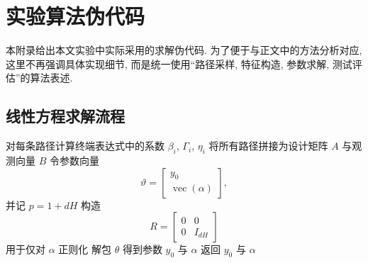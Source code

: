 
\chapter{实验算法伪代码}\label{ch:pseudocode}
  本附录给出本文实验中实际采用的求解伪代码.
  为了便于与正文中的方法分析对应, 这里不再强调具体实现细节,
  而是统一使用“路径采样, 特征构造, 参数求解, 测试评估”的算法表述.

  \section{线性方程求解流程}\label{sec:app_linear_method}
    \begin{algorithm}[htbp]
      \SetAlgoLined
      对每条路径计算终端表达式中的系数 $\beta_{i}$, $\Gamma_{i}$, $\eta_{i}$\;
      将所有路径拼接为设计矩阵 $A$ 与观测向量 $B$\;
      令参数向量
      \begin{equation*}
        \vartheta =
        \begin{bmatrix}
          y_{0} \\
          \operatorname{vec}(\alpha)
        \end{bmatrix},
      \end{equation*}
      并记 $p = 1 + dH$\;
      构造
      \begin{equation*}
        R =
        \begin{bmatrix}
          0 & 0 \\
          0 & I_{dH}
        \end{bmatrix}
      \end{equation*}
      用于仅对 $\alpha$ 正则化\;
      解包 $\theta$ 得到参数 $y_{0}$ 与 $\alpha$\;
      返回 $y_{0}$ 与 $\alpha$\;
      \caption{线性方程的求解流程}
      \label{alg:linear}
    \end{algorithm}

    \newpage

